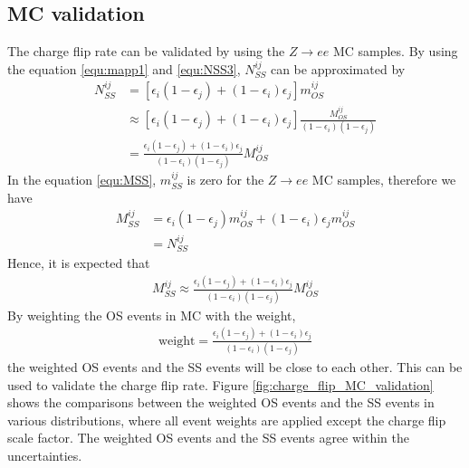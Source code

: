 \subsection{MC validation}
\label{sec:charge_flip_MC_validation}
The charge flip rate can be validated by using the $Z \rightarrow ee$ MC samples.
By using the equation \ref{equ:mapp1} and \ref{equ:NSS3}, $N^{ij}_{SS}$ can be approximated by
\begin{align}
N^{ij}_{SS} &= [ \epsilon_i (1-\epsilon_j) + (1-\epsilon_i) \epsilon_j ] m^{ij}_{OS} \\
&\approx [ \epsilon_i (1-\epsilon_j) + (1-\epsilon_i) \epsilon_j ] \frac{ M^{ij}_{OS} }{ (1-\epsilon_i) (1-\epsilon_j) } \\
&= \frac{\epsilon_i (1-\epsilon_j) + (1-\epsilon_i) \epsilon_j}{(1-\epsilon_i) (1-\epsilon_j)} M^{ij}_{OS}
\end{align}
In the equation \ref{equ:MSS}, $m^{ij}_{SS}$ is zero for the $Z \rightarrow ee$ MC samples, therefore we have
\begin{align}
M^{ij}_{SS} &= \epsilon_i (1-\epsilon_j) m^{ij}_{OS} + (1-\epsilon_i) \epsilon_j m^{ij}_{OS} \\
&= N^{ij}_{SS}
\end{align}
Hence, it is expected that
\begin{align}
M^{ij}_{SS} \approx \frac{\epsilon_i (1-\epsilon_j) + (1-\epsilon_i) \epsilon_j}{(1-\epsilon_i) (1-\epsilon_j)} M^{ij}_{OS}
\end{align}
By weighting the OS events in MC with the weight,
\begin{align}
\text{weight} = \frac{\epsilon_i (1-\epsilon_j) + (1-\epsilon_i) \epsilon_j}{(1-\epsilon_i) (1-\epsilon_j)}
\end{align}
the weighted OS events and the SS events will be close to each other.
This can be used to validate the charge flip rate.
Figure \ref{fig:charge_flip_MC_validation} shows the comparisons between the weighted OS events and the SS events in various distributions, where all event weights are applied except the charge flip scale factor.
The weighted OS events and the SS events agree within the uncertainties.
